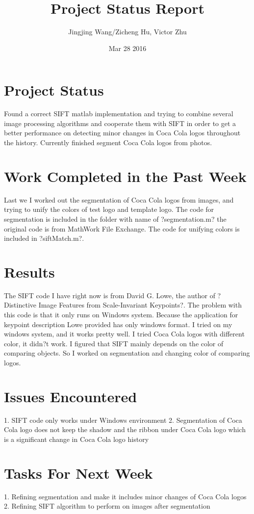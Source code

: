 \documentclass{article}
\begin{document}
   
\title{Project Status Report}
\author{Jingjing Wang/Zicheng Hu, Victor Zhu}
\date{Mar 28 2016}
\maketitle


\section{Project Status}

Found a correct SIFT matlab implementation and trying to combine several image processing algorithms and cooperate them with SIFT in order to get a better performance on detecting minor changes in Coca Cola logos throughout the history. Currently finished segment Coca Cola logos from photos.


\section{Work Completed in the Past Week}

Last we I worked out the segmentation of Coca Cola logos from images, and trying to unify the colors of test logo and template logo. The code for segmentation is included in the folder with name of ?segmentation.m? the original code is from MathWork File Exchange. The code for unifying colors is included in ?siftMatch.m?. 

\section{Results}

The SIFT code I have right now is from David G. Lowe, the author of ?Distinctive Image Features from Scale-Invariant Keypoints?. The problem with this code is that it only runs on Windows system. Because the application for keypoint description Lowe provided has only windows format. I tried on my windows system, and it works pretty well. I tried Coca Cola logos with different color, it didn?t work. I figured that SIFT mainly depends on the color of comparing objects. So I worked on segmentation and changing color of comparing logos.


\section{Issues Encountered}

1. SIFT code only works under Windows environment
2. Segmentation of Coca Cola logo does not keep the shadow and the ribbon under Coca Cola logo which is a significant change in Coca Cola logo history



\section{Tasks For Next Week}

1. Refining segmentation and make it includes minor changes of Coca Cola logos
2. Refining SIFT algorithm to perform on images after segmentation



   
\end{document}
